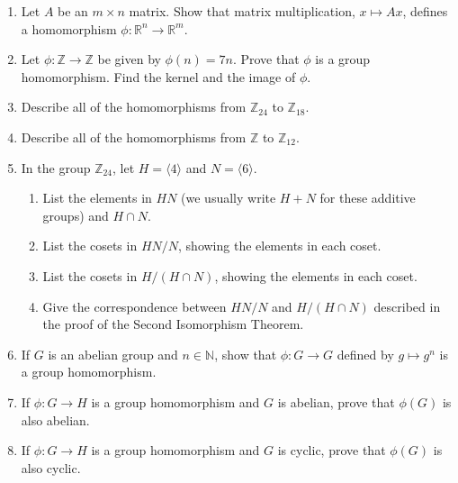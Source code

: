 {\begin{enumerate}
\begin{enumerate}
\end{enumerate}
 
  
 
\item
Let $A$ be an $m \times n$ matrix.  Show that matrix multiplication,
$x \mapsto Ax$, defines a homomorphism $\phi : {\mathbb R}^n \rightarrow
{\mathbb R}^m$. 
 
 
\item
Let $\phi : {\mathbb Z} \rightarrow {\mathbb Z}$ be given by $\phi(n) = 7n$.
Prove that $\phi$ is a group homomorphism. Find the kernel and the
image of $\phi$.
 
 
\item
Describe all of the homomorphisms from ${\mathbb Z}_{24}$ to ${\mathbb Z}_{18}$. 
 
 
\item
Describe all of the homomorphisms from ${\mathbb Z}$ to ${\mathbb Z}_{12}$. 
 
 
\item
In the group ${\mathbb Z}_{24}$, let $H = \langle 4 \rangle$ and $N =
\langle 6 \rangle$. 
\begin{enumerate}
 
 \item
List the elements in $HN$ (we usually write $H + N$ for these additive
groups) and $H \cap N$. 
 
 \item
List the cosets in $HN/N$, showing the elements in each coset.
 
 \item
List the cosets in $H/(H \cap N)$, showing the elements in each coset. 
 
 \item
Give the correspondence between $HN/N$ and $H/(H \cap N)$ described in
the proof of the Second Isomorphism Theorem. 
 
\end{enumerate}
 
 
 
 
\item
If $G$ is an abelian group and $n \in {\mathbb N}$, show that $\phi : G
\rightarrow G$  defined by $g \mapsto g^n$ is a group homomorphism. 
 
 

 
\item
If $\phi : G \rightarrow H$ is a group homomorphism and $G$ is
abelian, prove that $\phi(G)$ is also abelian. 
 
 
\item
If $\phi : G \rightarrow H$ is a group homomorphism and $G$ is cyclic,
prove that $\phi(G)$ is also cyclic. 
 

\end{enumerate}}
